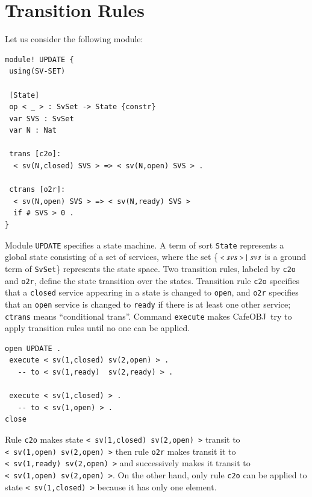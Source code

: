 \documentclass[12pt]{report}
\newcommand{\mbstt}[1]{\mbox{\small{\tt {#1}}}}
\newcommand{\stt}[1]{{\small{\tt {#1}}}}
\newcommand{\cafeobj}{{\sf CafeOBJ}~}
\begin{document}
\section{Transition Rules}
\label{sec:rules}
Let us consider the following module:
\begin{verbatim}
module! UPDATE {
 using(SV-SET)

 [State]
 op < _ > : SvSet -> State {constr}
 var SVS : SvSet    
 var N : Nat

 trans [c2o]: 
  < sv(N,closed) SVS > => < sv(N,open) SVS > .

 ctrans [o2r]: 
  < sv(N,open) SVS > => < sv(N,ready) SVS >
  if # SVS > 0 . 
}
\end{verbatim}
Module {\tt UPDATE} specifies a state machine. A term of sort
{\tt State} represents a global state consisting of a set of services,
where the set \{$\ \mbstt{<}\ svs\ \mbstt{>}\mid svs$ is a ground term
of {\tt SvSet}\} represents the state space. Two transition rules,
labeled by {\tt c2o} and {\tt o2r}, define the state transition over
the states.  Transition rule {\tt c2o} specifies that a {\tt closed}
service appearing in a state is changed to {\tt open}, and {\tt o2r}
specifies that an {\tt open} service is changed to {\tt ready} if
there is at least one other service; {\tt ctrans} means
``conditional trans''.  Command {\tt execute} makes \cafeobj try to
apply transition rules until no one can be applied.
\begin{verbatim}
open UPDATE .
 execute < sv(1,closed) sv(2,open) > .
   -- to < sv(1,ready)  sv(2,ready) > .

 execute < sv(1,closed) > .
   -- to < sv(1,open) > .
close
\end{verbatim}
Rule {\tt c2o} makes state \stt{<~sv(1,closed)~sv(2,open)~>} transit
to \stt{<~sv(1,open)~sv(2,open)~>} then rule {\tt o2r} makes transit
it to \stt{<~sv(1,ready)~sv(2,open)~>} and successively makes it
transit to \stt{<~sv(1,open)~sv(2,open)~>}. On the other hand,
only rule {\tt c2o} can be applied to state \stt{<~sv(1,closed)~>}
because it has only one element.

\end{document}
